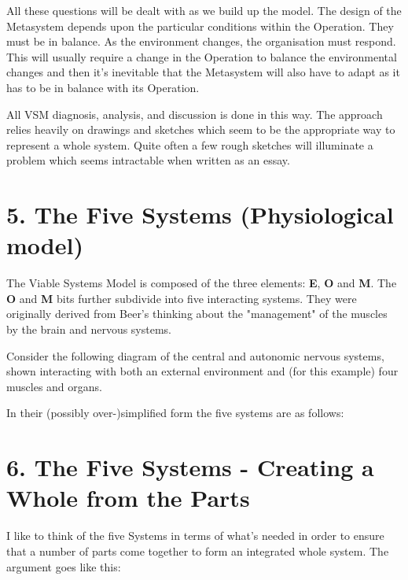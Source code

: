 All these questions will be dealt with as we build up the model. The design of the Metasystem depends upon the particular conditions within the Operation. They must be in balance. As the environment changes, the organisation must respond. This will usually require a change in the Operation to balance the environmental changes and then it's inevitable that the Metasystem will also have to adapt as it has to be in balance with its Operation.

All VSM diagnosis, analysis, and discussion is done in this way. The approach relies heavily on drawings and sketches which seem to be the appropriate way to represent a whole system. Quite often a few rough sketches will illuminate a problem which seems intractable when written as an essay.

\section*{5. The Five Systems (Physiological model)}
The Viable Systems Model is composed of the three elements: \textcolor{E}{\textbf{E}}, \textcolor{O}{\textbf{O}} and \textcolor{M}{\textbf{M}}. The \textcolor{O}{\textbf{O}} and \textcolor{M}{\textbf{M}} bits further subdivide into five interacting systems. They were originally derived from Beer's thinking about the "management" of the muscles by the brain and nervous systems.

Consider the following diagram of the central and autonomic nervous systems, shown interacting with both an external environment and (for this example) four muscles and organs.

In their (possibly over-)simplified form the five systems are as follows:


\section*{6. The Five Systems - Creating a Whole from the Parts}
I like to think of the five Systems in terms of what's needed in order to ensure that a number of parts come together to form an integrated whole system. The argument goes like this:

